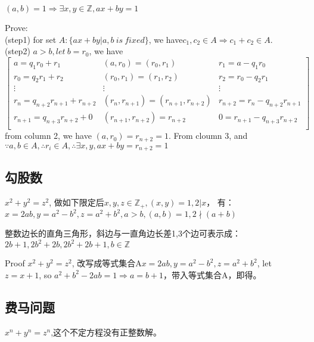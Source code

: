 \documentclass[UTF8]{../09-Mathematics}
\begin{document}
\begin{proposition}
    $ (a,b) = 1 \Rightarrow \exists x,y \in \mathbb Z, ax+by = 1$

    Prove:\\
    (step1) for set $A:\{  ax+by | a,b \ is \ fixed\}$, we have$c_1, c_2 \in A \Rightarrow c_1 + c_2 \in A$.\\
    (step2) $a>b, let \ b = r_0$, we have
    \begin{equation}
        \begin{bmatrix}
           a= q_{1}r_{0} + r_{1} & (a,r_0) = (r_0, r_1) & r_1 = a -  q_{1}r_{0}\\
           r_0= q_{2}r_{1} + r_{2} & (r_0,r_1) = (r_1, r_2) & r_2 = r_0 -  q_{2}r_{1}\\
           \vdots & \vdots & \vdots\\
           r_n= q_{n+2}r_{n+1} + r_{n+2} & (r_{n},r_{n+1}) = (r_{n+1}, r_{n+2}) & r_{n+2} = r_n - q_{n+2}r_{n+1}\\
           r_{n+1}= q_{n+3}r_{n+2} + 0 & (r_{n+1},r_{n+2}) = r_{n+2} & 0= r_{n+1} - q_{n+3}r_{n+2}\\
        \end{bmatrix}
    \end{equation} 
    from column 2, we have $(a,r_0) = r_{n+2} = 1$. From cloumn 3, and $\because a, b \in A, \therefore r_i \in A, \therefore \exists x, y, ax+by = r_{n+2} = 1$

\end{proposition}




\subsection{勾股数}

$ x^2 + y^2 = z^2$, 做如下限定后$x,y,z \in \mathbb Z_+, (x,y) = 1, 2|x$， 有：$x = 2ab, y = a^2-b^2, z = a^2 + b^2, a>b, (a,b) = 1, 2\nmid (a+b)$


\begin{proposition}
    整数边长的直角三角形，斜边与一直角边长差1,3个边可表示成：$ 2b+1, 2b^2+2b, 2b^2+2b+1, b \in \mathbb Z$

    Proof $x^2 + y^2 = z^2$, 改写成等式集合A$x = 2ab, y = a^2-b^2, z = a^2 + b^2$, let $z= x+1$, so $a^2 + b^2 -2ab = 1\Rightarrow a=b+1$，带入等式集合A，即得。
\end{proposition}

\subsection{费马问题}
$ x^n + y^n = z^n$,这个不定方程没有正整数解。
\end{document}
